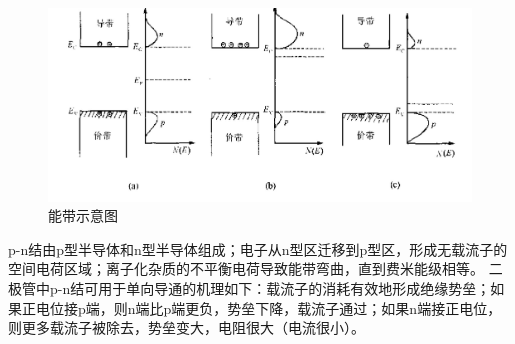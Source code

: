 \begin{figure}
    \centering
    \includegraphics[scale=0.25]{img/能带示意图.png}
    \caption{能带示意图}
\end{figure}

p-n结由p型半导体和n型半导体组成；电子从n型区迁移到p型区，形成无载流子的空间电荷区域；离子化杂质的不平衡电荷导致能带弯曲，直到费米能级相等。
二极管中p-n结可用于单向导通的机理如下：载流子的消耗有效地形成绝缘势垒；如果正电位接p端，则n端比p端更负，势垒下降，载流子通过；如果n端接正电位，则更多载流子被除去，势垒变大，电阻很大（电流很小）。\cite{RN47}